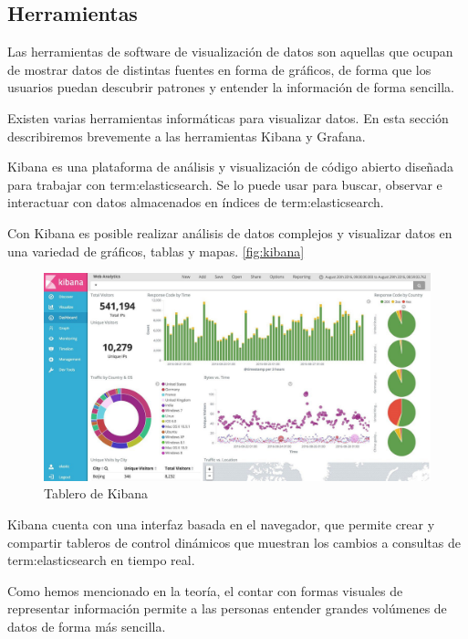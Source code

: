 \subsection{Herramientas}
\label{herramientas-de-visualizacion}

Las herramientas de software de visualización de datos son aquellas que ocupan de mostrar datos de distintas fuentes en forma de gráficos, de forma que los usuarios puedan descubrir patrones y entender la información de forma sencilla.

Existen varias herramientas informáticas para visualizar datos. En esta sección describiremos brevemente a las herramientas Kibana y Grafana.

Kibana es una plataforma de análisis y visualización de código abierto diseñada para trabajar con \gls{term:elasticsearch}. Se lo puede usar para buscar, observar e interactuar con datos almacenados en índices de \gls{term:elasticsearch}.

Con Kibana es posible realizar análisis de datos complejos y visualizar datos en una variedad de gráficos, tablas y mapas. \autoref{fig:kibana}


\begin{figure}
  \includegraphics[width=\linewidth]{src/images/05-capitulo-5/kibana.jpg}
  \caption{Tablero de Kibana}
  \label{fig:kibana}
\end{figure}

Kibana cuenta con una interfaz basada en el navegador, que permite crear y compartir tableros de control dinámicos que muestran los cambios a consultas de \gls{term:elasticsearch} en tiempo real.

Como hemos mencionado en la teoría, el contar con formas visuales de representar información permite a las personas entender grandes volúmenes de datos de forma más sencilla.

